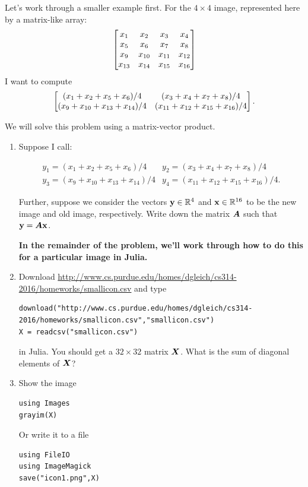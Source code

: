\documentclass[]{article}
\begin{document}
Let's work through a smaller example first. For the \(4 \times 4\)
image, represented here by a matrix-like array:
\[ \begin{bmatrix}  x_{1} & x_2 & x_3 & x_4 \\
          x_5 & x_6 & x_7 & x_8 \\
          x_9 & x_{10} & x_{11} & x_{12} \\
          x_{13} & x_{14} & x_{15} & x_{16}  \end{bmatrix}  \] I want to compute
\[ \begin{bmatrix}  (x_1 + x_2 + x_5 + x_6)/4 & (x_3 + x_4 + x_7 + x_8)/4 \\
   (x_9 + x_{10} + x_{13} + x_{14})/4 & (x_{11} + x_{12} + x_{15} + x_{16})/4  \end{bmatrix}. \]

We will solve this problem using a matrix-vector product.

\begin{enumerate}
\def\labelenumi{\arabic{enumi}.}
\item
  Suppose I call:

  \[ \begin{matrix} 
     y_1 = (x_1 + x_2 + x_5 + x_6)/4 & y_2 = (x_3 + x_4 + x_7 + x_8)/4 \\
     y_3 = (x_9 + x_{10} + x_{13} + x_{14})/4 & y_4 = (x_{11} + x_{12} + x_{15} + x_{16})/4. \end{matrix} \]

  Further, suppose we consider the vectors \(\boldsymbol{\mathrm{y}} \in \mathbb{R}^{4}\) and
  \(\boldsymbol{\mathrm{x}} \in \mathbb{R}^{16}\) to be the new image and old image, respectively.
  Write down the matrix \(\boldsymbol{A}\) such that \(\boldsymbol{\mathrm{y}} = \boldsymbol{A} \boldsymbol{\mathrm{x}}\).

  \textbf{In the remainder of the problem, we'll work through how to do
  this for a particular image in Julia. }
\item
  Download
  \url{http://www.cs.purdue.edu/homes/dgleich/cs314-2016/homeworks/smallicon.csv}
  and type

\begin{verbatim}
download("http://www.cs.purdue.edu/homes/dgleich/cs314-2016/homeworks/smallicon.csv","smallicon.csv")
X = readcsv("smallicon.csv")
\end{verbatim}

  in Julia. You should get a \(32 \times 32\) matrix \(\boldsymbol{X}\). What is
  the sum of diagonal elements of \(\boldsymbol{X}\)?
\item
  Show the image

\begin{verbatim}
using Images
grayim(X)
\end{verbatim}

  Or write it to a file

\begin{verbatim}
using FileIO
using ImageMagick
save("icon1.png",X)
\end{verbatim}


\end{enumerate}
\end{document}
